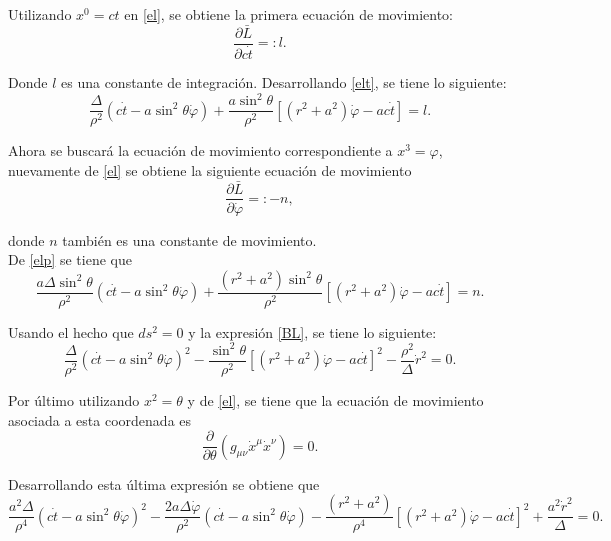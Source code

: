 Utilizando $x^0=ct$ en \eqref{el}, se obtiene la primera ecuación de movimiento:
\begin{equation}\label{elt}
\frac{\partial\bar{L}}{\partial c\dot{t}}=:l.
\end{equation}
 
Donde $l$ es una constante de integración. Desarrollando \eqref{elt}, se tiene lo siguiente:
\begin{equation}\label{11}
\frac{\Delta}{\rho^2}\left(c\dot{t}-a\sin^2 \theta \dot{\varphi}\right)+\frac{a\sin^2 \theta}{\rho^2}\left[(r^2+a^2)\dot{\varphi}-ac\dot{t} \right]=l.
\end{equation} 
 
 Ahora se buscará la ecuación de movimiento correspondiente a $x^3=\varphi$, nuevamente de \eqref{el} se obtiene la siguiente ecuación de movimiento
 \begin{equation}\label{elp}
 \frac{\partial\bar{L}}{\partial \dot{\varphi}}=: -n,
 \end{equation}
 
donde $n$ también es una constante de movimiento.\\

De \eqref{elp} se tiene que
\begin{equation}\label{22}
\frac{a\Delta \sin^2 \theta}{\rho^2}\left(c\dot{t}-a\sin^2 \theta \dot{\varphi}\right)+\frac{(r^2+a^2)\sin^2 \theta}{\rho^2}\left[(r^2+a^2)\dot{\varphi}-ac\dot{t} \right]=n.
\end{equation}
 
Usando el hecho que $ds^2=0$ y la expresión \eqref{BL}, se tiene lo siguiente:
\begin{equation}\label{33}
\frac{\Delta}{\rho^2}(c\dot{t}-a\sin^2\theta \dot{\varphi})^2-\frac{\sin^2\theta}{\rho^2}\left[(r^2+a^2)\dot{\varphi}-ac\dot{t} \right]^2-\frac{\rho^2}{\Delta}\dot{r}^2=0.
\end{equation} 
 
Por último utilizando $x^2=\theta$ y de \eqref{el}, se tiene que la ecuación de movimiento asociada a esta coordenada es
\begin{equation}
\frac{\partial }{\partial \theta}\left(g_{\mu \nu}\dot{x}^{\mu}\dot{x}^{\nu} \right)=0.
\end{equation} 

Desarrollando esta última expresión se obtiene que
\begin{equation}\label{44}
\frac{a^2\Delta}{\rho^4}\left(c\dot{t}-a\sin^2 \theta \dot{\varphi} \right)^2-\frac{2a\Delta \dot{\varphi}}{\rho^2}\left(c\dot{t}-a\sin^2 \theta \dot{\varphi} \right)-\frac{(r^2+a^2)}{\rho^4}\left[(r^2+a^2)\dot{\varphi}-ac\dot{t} \right]^2+\frac{a^2\dot{r}^2}{\Delta}=0.
\end{equation}
 

